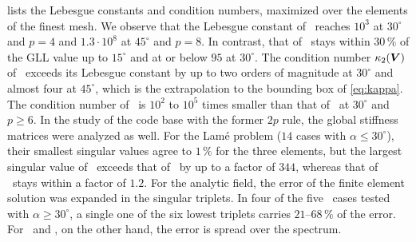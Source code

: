 \begin{table}[htbp]
  \centering\small
  \caption{Thick cylinder, $N=8$: energy-norm error of the finite element solution divided by the energy-norm error of the interpolant of the exact field with the same trial functions.}
  \label{tab:quasiopt}
  
\end{table}

 lists the Lebesgue constants and condition numbers, maximized over the elements of the finest mesh. We observe that the Lebesgue constant of \PM\ reaches $10^3$ at $30^\circ$ and $p=4$ and $1.3\cdot10^8$ at $45^\circ$ and $p=8$. In contrast, that of \PH\ stays within $30\,\%$ of the GLL value up to $15^\circ$ and at or below $95$ at $30^\circ$. The condition number $\cond_2(\matr V)$ of \PM\ exceeds its Lebesgue constant by up to two orders of magnitude at $30^\circ$ and almost four at $45^\circ$, which is the extrapolation to the bounding box of \cref{eq:kappa}. The condition number of \PH\ is $10^2$ to $10^5$ times smaller than that of \PM\ at $30^\circ$ and $p\ge6$. In the study of the code base with the former $2p$ rule, the global stiffness matrices were analyzed as well. For the Lam\'e problem ($14$ cases with $\alpha\le30^\circ$), their smallest singular values agree to $1\,\%$ for the three elements, but the largest singular value of \PM\ exceeds that of \PP\ by up to a factor of $344$, whereas that of \PH\ stays within a factor of $1.2$. For the analytic field, the error of the finite element solution was expanded in the singular triplets. In four of the five \PM\ cases tested with $\alpha\ge30^\circ$, a single one of the six lowest triplets carries $21$--$68\,\%$ of the error. For \PH\ and \PP, on the other hand, the error is spread over the spectrum.

\begin{table}[htbp]
  \centering\small
  \caption{Thick cylinder, $N=8$: Lebesgue constant $\Lam$ ($16\times16$ sample points per element, a lower bound) and condition number $\cond_2(\matr V)$ of the interpolation matrix, largest value over the elements.}
  \label{tab:cyllebesgue}
  
\end{table}

